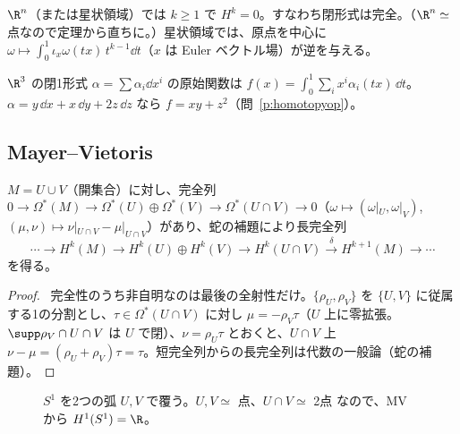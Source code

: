 \begin{cor}\label{cor:poincare}
$\R^n$（または星状領域）では $k\ge1$ で $H^k=0$。すなわち閉形式は完全。（$\R^n\simeq$ 点なので定理から直ちに。）星状領域では、原点を中心に $\omega\mapsto\int_0^1\iota_{x}\omega(tx)\,t^{k-1}\dd t$（$x$ は Euler ベクトル場）が逆を与える。
\end{cor}

\begin{ex}\label{ex:primitive}
$\R^3$ の閉1形式 $\alpha=\sum\alpha_i\dd x^i$ の原始関数は $f(x)=\int_0^1\sum_ix^i\alpha_i(tx)\,\dd t$。$\alpha=y\,\dd x+x\,\dd y+2z\,\dd z$ なら $f=xy+z^2$（問~\ref{p:homotopyop}）。
\end{ex}

\subsection{Mayer--Vietoris}
\begin{thm}\label{thm:MV}
$M=U\cup V$（開集合）に対し、完全列 $0\to\Omega^*(M)\to\Omega^*(U)\oplus\Omega^*(V)\to\Omega^*(U\cap V)\to0$（$\omega\mapsto(\omega|_U,\omega|_V)$, $(\mu,\nu)\mapsto\nu|_{U\cap V}-\mu|_{U\cap V}$）があり、蛇の補題により長完全列
\[
\cdots\to H^k(M)\to H^k(U)\oplus H^k(V)\to H^k(U\cap V)\xrightarrow{\ \delta\ }H^{k+1}(M)\to\cdots
\]
を得る。
\end{thm}
\begin{proof}
\tP\ 完全性のうち非自明なのは最後の全射性だけ。$\{\rho_U,\rho_V\}$ を $\{U,V\}$ に従属する1の分割とし、$\tau\in\Omega^*(U\cap V)$ に対し $\mu=-\rho_V\tau$（$U$ 上に零拡張。$\supp\rho_V\cap U\cap V$ は $U$ で閉）、$\nu=\rho_U\tau$ とおくと、$U\cap V$ 上 $\nu-\mu=(\rho_U+\rho_V)\tau=\tau$。短完全列からの長完全列は代数の一般論（蛇の補題）。
\end{proof}

\begin{figure}[h]
\centering
{}
\caption{$S^1$ を2つの弧 $U,V$ で覆う。$U,V\simeq$ 点、$U\cap V\simeq$ 2点 なので、MV から $H^1(S^1)=\R$。}
\end{figure}


